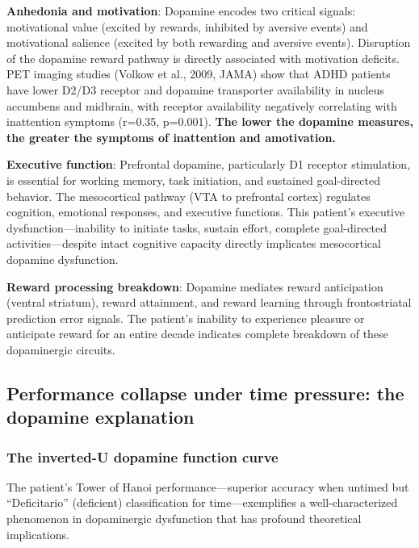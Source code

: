 \textbf{Anhedonia and motivation}: Dopamine encodes two critical signals: motivational value (excited by rewards, inhibited by aversive events) and motivational salience (excited by both rewarding and aversive events). Disruption of the dopamine reward pathway is directly associated with motivation deficits. PET imaging studies (Volkow et al., 2009, JAMA) show that ADHD patients have lower D2/D3 receptor and dopamine transporter availability in nucleus accumbens and midbrain, with receptor availability negatively correlating with inattention symptoms (r=0.35, p=0.001). \textbf{The lower the dopamine measures, the greater the symptoms of inattention and amotivation.}

\textbf{Executive function}: Prefrontal dopamine, particularly D1 receptor stimulation, is essential for working memory, task initiation, and sustained goal-directed behavior. The mesocortical pathway (VTA to prefrontal cortex) regulates cognition, emotional responses, and executive functions. This patient's executive dysfunction---inability to initiate tasks, sustain effort, complete goal-directed activities---despite intact cognitive capacity directly implicates mesocortical dopamine dysfunction.

\textbf{Reward processing breakdown}: Dopamine mediates reward anticipation (ventral striatum), reward attainment, and reward learning through frontostriatal prediction error signals. The patient's inability to experience pleasure or anticipate reward for an entire decade indicates complete breakdown of these dopaminergic circuits.

\subsection{Performance collapse under time pressure: the dopamine explanation}\label{10a_trd_basis-performance-collapse-under-time-pressure-the-dopamine-explanation}

\subsubsection{The inverted-U dopamine function curve}\label{10a_trd_basis-the-inverted-u-dopamine-function-curve}

The patient's Tower of Hanoi performance---superior accuracy when untimed but ``Deficitario'' (deficient) classification for time---exemplifies a well-characterized phenomenon in dopaminergic dysfunction that has profound theoretical implications.

